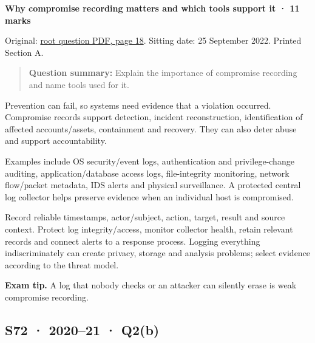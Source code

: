 \documentclass[11pt,a4paper]{article}
\begin{document}
\textbf{Why compromise recording matters and which tools support it · 11 marks}


Original: \href{../../CSE405-Security_Merged.pdf\#page=18}{root question PDF,\allowbreak{} page 18}. Sitting date: 25 September 2022. Printed Section A.



\begin{quote}\small

\textbf{Question summary:} Explain the importance of compromise recording and name tools used for it.



\end{quote}

Prevention can fail,\allowbreak{} so systems need evidence that a violation occurred. Compromise records support detection,\allowbreak{} incident reconstruction,\allowbreak{} identification of affected accounts/\allowbreak{}assets,\allowbreak{} containment and recovery. They can also deter abuse and support accountability.


Examples include OS security/\allowbreak{}event logs,\allowbreak{} authentication and privilege-change auditing,\allowbreak{} application/\allowbreak{}database access logs,\allowbreak{} file-integrity monitoring,\allowbreak{} network flow/\allowbreak{}packet metadata,\allowbreak{} IDS alerts and physical surveillance. A protected central log collector helps preserve evidence when an individual host is compromised.


Record reliable timestamps,\allowbreak{} actor/\allowbreak{}subject,\allowbreak{} action,\allowbreak{} target,\allowbreak{} result and source context. Protect log integrity/\allowbreak{}access,\allowbreak{} monitor collector health,\allowbreak{} retain relevant records and connect alerts to a response process. Logging everything indiscriminately can create privacy,\allowbreak{} storage and analysis problems; select evidence according to the threat model.



{\color{ForestGreen}\textbf{Exam tip.} A log that nobody checks or an attacker can silently erase is weak compromise recording.}




\clearpage
\subsection{S72 · 2020–21 · Q2(b)}\label{s72}
\end{document}
